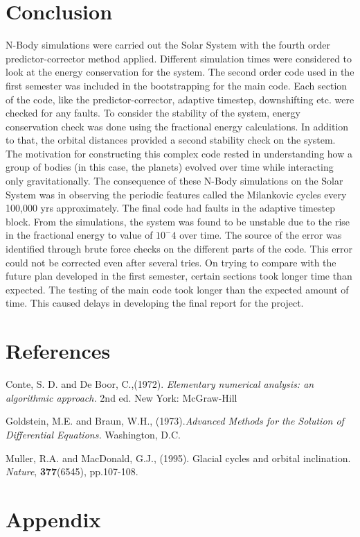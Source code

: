 \documentclass[11pt]{article}
\begin{document}
\section{Conclusion}
{\normalsize{
N-Body simulations were carried out the Solar System with the fourth order predictor-corrector method applied. Different simulation times were considered to look at the energy conservation for the system. The second order code used in the first semester was included in the bootstrapping for the main code. Each section of the code, like the predictor-corrector, adaptive timestep, downshifting etc. were checked for any faults. To consider the stability of the system, energy conservation check was done using the fractional energy calculations. In addition to that, the orbital distances provided a second stability check on the system. The motivation for constructing this complex code rested in understanding how a group of bodies (in this case, the planets) evolved over time while interacting only gravitationally. The consequence of these N-Body simulations on the Solar System was in observing the periodic features called the Milankovic cycles every 100,000 yrs approximately. The final code had faults in the adaptive timestep block. From the simulations, the system was found to be unstable due to the rise in the fractional energy to value of $10^-4$ over time. The source of the error was identified through brute force checks on the different parts of the code. This error could not be corrected even after several tries. On trying to compare with the future plan developed in the first semester, certain sections took longer time than expected. The testing of the main code took longer than the expected amount of time. This caused delays in developing the final report for the project.}} 

\bigskip

\section{References}
{\normalsize{
Conte, S. D. and De Boor, C.,(1972). {\it Elementary numerical analysis: an algorithmic approach.} 2nd ed. New York: McGraw-Hill

Goldstein, M.E. and Braun, W.H., (1973).{\it Advanced Methods for the Solution of Differential Equations.} Washington, D.C.

Muller, R.A. and MacDonald, G.J., (1995). Glacial cycles and orbital inclination. {\it Nature}, {\bf 377}(6545), pp.107-108.
}}

\bigskip

\section{Appendix}
\end{document}
